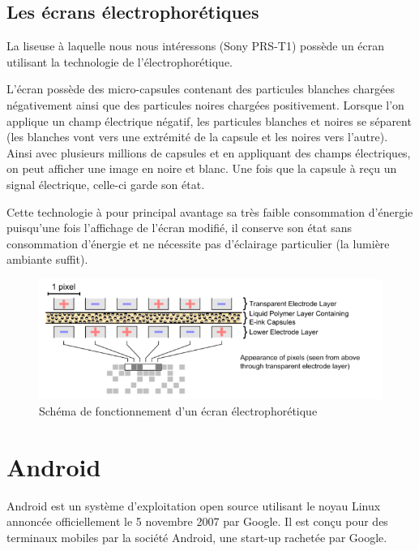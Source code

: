 \newpage

\subsection{Les écrans électrophorétiques}

La liseuse à laquelle nous nous intéressons (Sony PRS-T1) possède un écran utilisant la technologie de l'électrophorétique.

L'écran possède des micro-capsules contenant des particules blanches chargées négativement ainsi que des particules noires chargées positivement. Lorsque l'on applique un champ électrique négatif, les particules blanches et noires se séparent (les blanches vont vers une extrémité de la capsule et les noires vers l'autre). Ainsi avec plusieurs millions de capsules et en appliquant des champs électriques, on peut afficher une image en noire et blanc. Une fois que la capsule à reçu un signal électrique, celle-ci garde son état.

Cette technologie à pour principal avantage sa très faible consommation d'énergie puisqu'une fois l'affichage de l'écran modifié, il conserve son état sans consommation d'énergie et ne nécessite pas d'éclairage particulier (la lumière ambiante suffit).

\begin{figure}[h!]
\begin{center}
	\includegraphics{Electrophoretic.png}
	\caption{Schéma de fonctionnement d'un écran électrophorétique}
\end{center}
\end{figure}

\newpage

\section{Android}
Android est un système d'exploitation open source utilisant le noyau Linux annoncée officiellement le 5 novembre 2007 par Google. Il est conçu pour des terminaux mobiles par la société Android, une start-up rachetée par Google.

